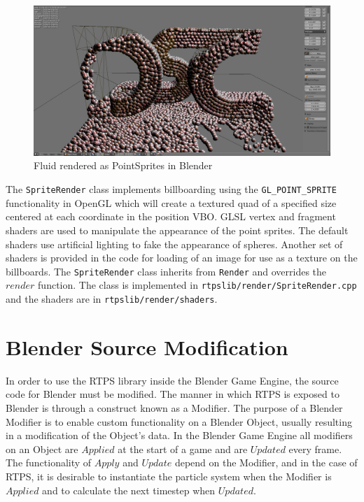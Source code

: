 \begin{figure}[!htc]
 		\centering
		\includegraphics[scale=0.2]{figures/pointsprites.png}
        \caption{ Fluid rendered as PointSprites in Blender }
		\label{fig:pointsprites}
\end{figure}


The \verb|SpriteRender| class implements billboarding using the
\verb|GL_POINT_SPRITE| functionality in OpenGL which will create a textured quad
of a specified size centered at each coordinate in the position VBO. GLSL
vertex and fragment shaders are used to manipulate the appearance of the point
sprites. The default shaders use artificial lighting to fake the appearance of
spheres. Another set of shaders is provided in the code for loading of an image
for use as a texture on the billboards. The \verb|SpriteRender| class inherits
from \verb|Render| and overrides the $render$ function. The class is
implemented in \verb|rtpslib/render/SpriteRender.cpp| and the shaders are in
\verb|rtpslib/render/shaders|.


\section{Blender Source Modification}

In order to use the RTPS library inside the Blender Game Engine, the source code
for Blender must be modified. The manner in which RTPS is exposed to Blender is
through a construct known as a Modifier. The purpose of a Blender Modifier is
to enable custom functionality on a Blender Object, usually resulting in a
modification of the Object's data. In the Blender Game Engine all modifiers on an Object are
$Applied$ at the start of a game and are $Updated$ every frame. The functionality 
of $Apply$ and $Update$ depend on the Modifier, and in the case of RTPS, it is
desirable to instantiate the particle system when the Modifier is $Applied$ and
to calculate the next timestep when $Updated$.


